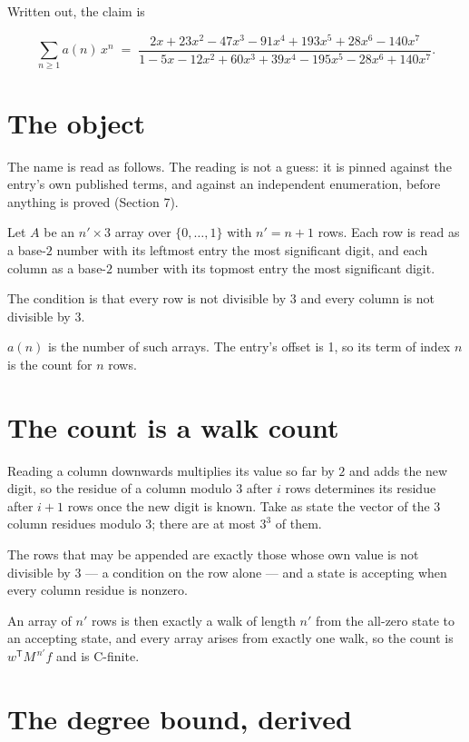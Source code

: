 \documentclass[11pt]{article}
\theoremstyle{definition}
\begin{document}
Written out, the claim is

\[\sum_{n \ge 1} a(n)\,x^n \;=\; \frac{2x + 23x^{2} - 47x^{3} - 91x^{4} + 193x^{5} + 28x^{6} - 140x^{7}}{1 - 5x - 12x^{2} + 60x^{3} + 39x^{4} - 195x^{5} - 28x^{6} + 140x^{7}}.\]

\section{The object}

The name is read as follows. The reading is not a guess: it is pinned against the entry's own published terms, and against an independent enumeration, before anything is proved (Section 7).

Let $A$ be an $n' \times 3$ array over $\{0,\dots,1\}$ with $n' = n + 1$ rows. Each row is read as a base-$2$ number with its leftmost entry the most significant digit, and each column as a base-$2$ number with its topmost entry the most significant digit.

The condition is that every row is not divisible by $3$ and every column is not divisible by $3$.

$a(n)$ is the number of such arrays. The entry's offset is 1, so its term of index $n$ is the count for $n$ rows.

\section{The count is a walk count}

Reading a column downwards multiplies its value so far by $2$ and adds the new digit, so the residue of a column modulo $3$ after $i$ rows determines its residue after $i+1$ rows once the new digit is known. Take as state the vector of the $3$ column residues modulo $3$; there are at most $3^{3}$ of them.

The rows that may be appended are exactly those whose own value is not divisible by $3$ --- a condition on the row alone --- and a state is accepting when every column residue is nonzero.

An array of $n'$ rows is then exactly a walk of length $n'$ from the all-zero state to an accepting state, and every array arises from exactly one walk, so the count is $w^{\mathsf T}M^{\,n'}f$ and is C-finite.

\section{The degree bound, derived}
\end{document}
